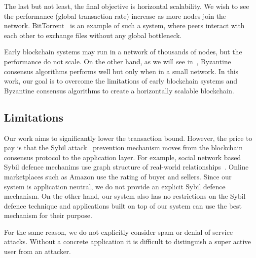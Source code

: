 The last but not least, the final objective is horizontal scalability.
We wish to see the performance (global transaction rate) increase as more nodes join the network.
BitTorrent~\cite{cohen2003incentives} is an example of such a system,
where peers interact with each other to exchange files without any global bottleneck.

Early blockchain systems may run in a network of thousands of nodes, but the performance do not scale.
On the other hand, as we will see in~, Byzantine consensus algorithms performs well but only when in a small network.
In this work, our goal is to overcome the limitations of early blockchain systems and Byzantine consensus algorithms to create a horizontally scalable blockchain.

\subsection{Limitations}
Our work aims to significantly lower the transaction bound.
However, the price to pay is that the Sybil attack~\cite{douceur2002sybil} prevention mechanism moves from the blockchain consensus protocol to the application layer.
For example, social network based Sybil defence mechanims use graph structure of real-world relationships~\cite{yu2006sybilguard}.
Online marketplaces such as Amazon use the rating of buyer and sellers.
Since our system is application neutral, we do not provide an explicit Sybil defence mechanism.
On the other hand, our system also has no restrictions on the Sybil defence technique
and applications built on top of our system can use the best mechanism for their purpose.

For the same reason, we do not explicitly consider spam or denial of service attacks.
Without a concrete application it is difficult to distinguish a super active user from an attacker.



